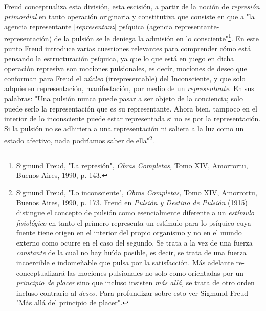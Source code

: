 \documentclass{book}
\begin{document}
Freud conceptualiza esta división, esta escisión, a partir de la noción
de \emph{represión primordial} en tanto operación originaria y
constitutiva que consiste en que a "la agencia representante
{[}\emph{representanz}{]} psíquica (agencia
representante-representación) de la pulsión se le deniega la admisión en
lo consciente"\footnote{Sigmund Freud, "La represión", \emph{Obras
  Completas,} Tomo XIV, Amorrortu, Buenos Aires, 1990, p. 143.}. En este
punto Freud introduce varias cuestiones relevantes para comprender cómo
está pensando la estructuración psíquica, ya que lo que está en juego en
dicha operación represiva son mociones pulsionales, es decir, mociones
de deseo que conforman para Freud el \emph{núcleo} (irrepresentable) del
Inconsciente, y que solo adquieren representación, manifestación, por
medio de un \emph{representante}. En sus palabras: "Una pulsión nunca
puede pasar a ser objeto de la conciencia; solo puede serlo la
representación que es su representante. Ahora bien, tampoco en el
interior de lo inconsciente puede estar representada si no es por la
representación. Si la pulsión no se adhiriera a una representación ni
saliera a la luz como un estado afectivo, nada podríamos saber de
ella"\footnote{Sigmund Freud, "Lo inconsciente", \emph{Obras Completas,}
  Tomo XIV, Amorrortu, Buenos Aires, 1990, p. 173. Freud en
  \emph{Pulsión y Destino de Pulsión} (1915) distingue el concepto de
  pulsión como esencialmente diferente a un \emph{estímulo fisiológico}
  en tanto el primero representa un estímulo para lo psíquico cuya
  fuente tiene origen en el interior del propio organismo y no en el
  mundo externo como ocurre en el caso del segundo. Se trata a la vez de
  una fuerza \emph{constante} de la cual no hay huída posible, es decir,
  se trata de una fuerza incoercible e indomeñable que pulsa por la
  satisfacción. Más adelante re-conceptualizará las mociones pulsionales
  no solo como orientadas por un \emph{principio de placer} sino que
  incluso insisten \emph{más allá,} se trata de otro orden incluso
  contrario al \emph{deseo}. Para profundizar sobre esto ver Sigmund
  Freud "Más allá del principio de placer"\emph{.}}.
\end{document}
